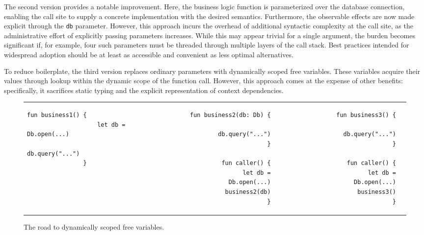 \documentclass[acmsmall,review,screen]{acmart}
\begin{document}
The second version provides a notable improvement.
Here, the business logic function is parameterized over the database connection, enabling the call site to supply a concrete implementation with the desired semantics.
Furthermore, the observable effects are now made explicit through the \texttt{db} parameter.
However, this approach incurs the overhead of additional syntactic complexity at the call site, as the administrative effort of explicitly passing parameters increases.
While this may appear trivial for a single argument, the burden becomes significant if, for example, four such parameters must be threaded through multiple layers of the call stack.
Best practices intended for widespread adoption should be at least as accessible and convenient as less optimal alternatives.

To reduce boilerplate, the third version replaces ordinary parameters with dynamically scoped free variables.
These variables acquire their values through lookup within the dynamic scope of the function call.
However, this approach comes at the expense of other benefits: specifically, it sacrifices static typing and the explicit representation of context dependencies.

\begin{figure}
    \begin{tabular}{p{} rrr}
        \begin{minipage}[t]{0.35\textwidth}
            \begin{lstlisting}[language=colang, gobble=16]
                fun business1() {
                    let db = Db.open(...)
                    db.query("...")
                }
            \end{lstlisting}
        \end{minipage}
        &
        \begin{minipage}[t]{0.35\textwidth}
            \begin{lstlisting}[language=colang, gobble=16]
                fun business2(db: Db) {
                    db.query("...")
                }

                fun caller() {
                    let db = Db.open(...)
                    business2(db)
                }
            \end{lstlisting}
        \end{minipage}
        &
        \begin{minipage}[t]{0.35\textwidth}
            \begin{lstlisting}[language=colang, gobble=16]
                fun business3() {
                    db.query("...")
                }

                fun caller() {
                    let db = Db.open(...)
                    business3()
                }
            \end{lstlisting}
        \end{minipage}
    \end{tabular}
    \caption{The road to dynamically scoped free variables.}
    \label{fig:db}
\end{figure}
\end{document}
